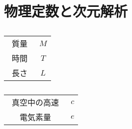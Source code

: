 
\section{物理定数と次元解析}

\begin{table}[htb]

  \begin{tabular}{cc}

      質量　& $M$ \\
      時間　& $T$ \\
      長さ  & $L$ \\
  \end{tabular}
  \caption{}
  \label{}

\end{table}

\begin{table}[htb]

  \begin{tabular}{cc}

    真空中の高速　& $c$ \\
    電気素量     & $e$ \\


  \end{tabular}
  \caption{}
  \label{}

\end{table}
